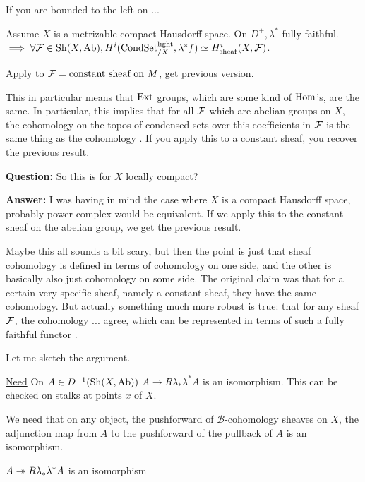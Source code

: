 If you are bounded to the left on ... 

\begin{theorem} \label{theorem:04-X-metrizable}
Assume $X$ is a metrizable compact Hausdorff space.
On $D^+, \lambda^\ast$ fully faithful.
$\implies \forall \mathcal F \in \operatorname{Sh}(X,\mathrm{Ab}), H^i(\mathrm{Cond}\mathrm{Set}_{/X}^{\mathrm{light}},\lambda^\ast f) \simeq H_{\mathrm{sheaf}}^i(X,\mathcal F)$.

Apply to $\mathcal F = \text{constant sheaf on $M$}$, get previous version.

\end{theorem}

This in particular means that $\operatorname{Ext}$ groups, which are some kind of $\operatorname{Hom}$'s, are the same. 
In particular, this implies that for all $\mathcal F$ which are abelian groups on $X$, the cohomology on the topos of condensed sets over this coefficients in $\mathcal F$ is the same thing as the cohomology . If you apply this to a constant sheaf, you recover the previous result. 

\textbf{Question:} So this is for $X$ locally compact?

\textbf{Answer:} I was having in mind the case where $X$ is a compact Hausdorff space, probably power complex  would be equivalent. 
If we apply this to the constant sheaf on the abelian group, we get the previous result.

Maybe this all sounds a bit scary, but then the point is just that sheaf cohomology is defined in terms of cohomology on one side, and the other is basically also just cohomology on some side. 
The original claim was that for a certain very specific sheaf, namely a constant sheaf, they have the same cohomology. 
But actually something much more robust is true: that for any sheaf $\mathcal F$, the cohomology ... agree, which can be represented in terms of such a fully faithful functor .


Let me sketch the argument. 
\begin{sketch}
\underline{Need} On $A \in D^{-1}(\operatorname{Sh}(X,\mathrm{Ab}))$
$A \to R \lambda_\ast \lambda^\ast A$ is an isomorphism.
This can be checked on stalks at points $x$ of $X$.
\end{sketch}
We need that on any object, the pushforward of $\mathcal{B}$-cohomology sheaves on $X$, the adjunction map from $A$ to the pushforward of the pullback of $A$ is an isomorphism. 

$A \twoheadrightarrow R \lambda_\ast \lambda^\ast A $ is an isomorphism

